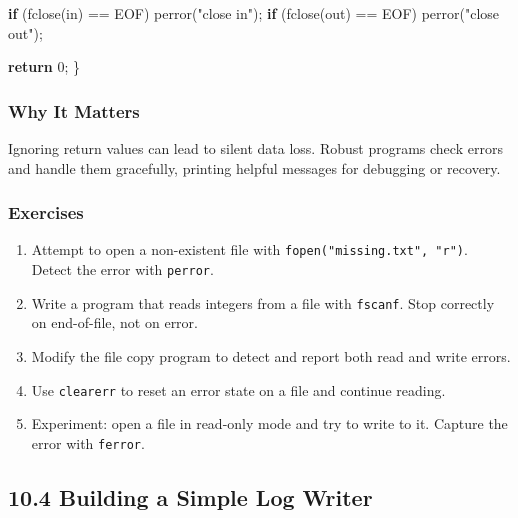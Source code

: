\documentclass[
  letterpaper,
  DIV=11,
  numbers=noendperiod]{scrreprt}
\newenvironment{Shaded}{\begin{snugshade}}{\end{snugshade}}
\newcommand{\ControlFlowTok}[1]{\textcolor[rgb]{0.00,0.23,0.31}{\textbf{#1}}}
\newcommand{\DecValTok}[1]{\textcolor[rgb]{0.68,0.00,0.00}{#1}}
\newcommand{\NormalTok}[1]{\textcolor[rgb]{0.00,0.23,0.31}{#1}}
\newcommand{\OperatorTok}[1]{\textcolor[rgb]{0.37,0.37,0.37}{#1}}
\newcommand{\StringTok}[1]{\textcolor[rgb]{0.13,0.47,0.30}{#1}}
\providecommand{\tightlist}{%
  \setlength{\itemsep}{0pt}\setlength{\parskip}{0pt}}
\begin{document}
\begin{Shaded}
\begin{Highlighting}[]
    \ControlFlowTok{if} \OperatorTok{(}\NormalTok{fclose}\OperatorTok{(}\NormalTok{in}\OperatorTok{)} \OperatorTok{==}\NormalTok{ EOF}\OperatorTok{)}\NormalTok{ perror}\OperatorTok{(}\StringTok{"close in"}\OperatorTok{);}
    \ControlFlowTok{if} \OperatorTok{(}\NormalTok{fclose}\OperatorTok{(}\NormalTok{out}\OperatorTok{)} \OperatorTok{==}\NormalTok{ EOF}\OperatorTok{)}\NormalTok{ perror}\OperatorTok{(}\StringTok{"close out"}\OperatorTok{);}

    \ControlFlowTok{return} \DecValTok{0}\OperatorTok{;}
\OperatorTok{\}}
\end{Highlighting}
\end{Shaded}

\subsubsection{Why It Matters}\label{why-it-matters-45}

Ignoring return values can lead to silent data loss. Robust programs
check errors and handle them gracefully, printing helpful messages for
debugging or recovery.

\subsubsection{Exercises}\label{exercises-47}

\begin{enumerate}
\def\labelenumi{\arabic{enumi}.}
\tightlist
\item
  Attempt to open a non-existent file with
  \texttt{fopen("missing.txt",\ "r")}. Detect the error with
  \texttt{perror}.
\item
  Write a program that reads integers from a file with \texttt{fscanf}.
  Stop correctly on end-of-file, not on error.
\item
  Modify the file copy program to detect and report both read and write
  errors.
\item
  Use \texttt{clearerr} to reset an error state on a file and continue
  reading.
\item
  Experiment: open a file in read-only mode and try to write to it.
  Capture the error with \texttt{ferror}.
\end{enumerate}

\subsection{10.4 Building a Simple Log
Writer}\label{building-a-simple-log-writer}
\end{document}
